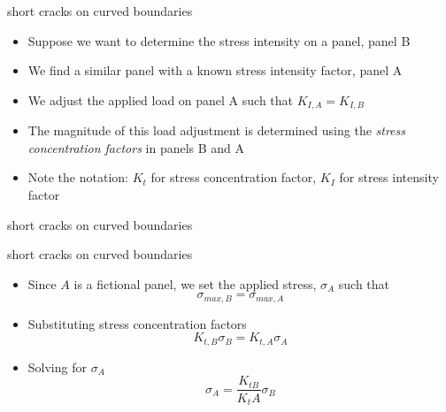 \documentclass[10pt]{beamer}
\begin{document}
\begin{frame}{short cracks on curved boundaries}
	\begin{itemize}
		\item Suppose we want to determine the stress intensity on a panel, panel B
		\item We find a similar panel with a known stress intensity factor, panel A
		\item We adjust the applied load on panel A such that $K_{I,A} = K_{I,B}$
		\item The magnitude of this load adjustment is determined using the \emph{stress concentration factors} in panels B and A
		\item Note the notation: $K_t$ for stress concentration factor, $K_I$ for stress intensity factor
	\end{itemize}
\end{frame}

\begin{frame}{short cracks on curved boundaries}
	\begin{figure}
	\end{figure}
\end{frame}

\begin{frame}{short cracks on curved boundaries}
	\begin{itemize}
		\item Since $A$ is a fictional panel, we set the applied stress, $\sigma_A$ such that
		\begin{equation*}
		\sigma_{max,B} = \sigma_{max,A}
		\end{equation*}
		\pause
		\item Substituting stress concentration factors
		\begin{equation*}
		K_{t,B} \sigma_B = K_{t,A} \sigma_A
		\end{equation*}
		\pause
		\item Solving for $\sigma_A$
		\begin{equation*}
		\sigma_A = \frac{K_{tB}}{K_tA}\sigma_B
		\end{equation*}
	\end{itemize}
\end{frame}
\end{document}
